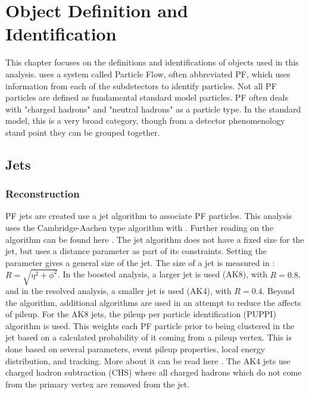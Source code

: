 \chapter{Object Definition and Identification}
\label{ch:objs}
This chapter focuses on the definitions and identifications of objects used in this analysis.  \CMS uses a system called Particle Flow, often abbreviated PF, which uses information from each of the subdetectors to identify particles. Not all PF particles are defined as fundamental standard model particles. PF often deals with "charged hadrons" and "neutral hadrons" as a particle type. In the standard model, this is a very broad category, though from a detector phenomenology stand point they can be grouped together.
\section{Jets}

\subsection{Reconstruction}
\label{sec:jetreco}
PF jets are created use a jet algorithm to associate PF particles. This analysis uses the Cambridge-Aachen type algorithm with \antikt. Further reading on the \antikt algorithm can be found here . The jet algorithm does not have a fixed size for the jet, but uses a distance parameter as part of its constraints. Setting the parameter gives a general size of the jet.  The size of a jet is measured in \etaphi: \ensuremath{R=\sqrt{\eta^2+\phi^2}}.  In the boosted analysis, a larger jet is used (AK8), with \ensuremath{R=0.8}, and in the resolved analysis, a smaller jet is used (AK4), with \ensuremath{R=0.4}.  Beyond the \antikt algorithm, additional algorithms are used in an attempt to reduce the affects of pileup.  For the AK8 jets, the pileup per particle identification (PUPPI) algorithm is used.  This weights each PF particle prior to being clustered in the jet based on a calculated probability of it coming from a pileup vertex.  This is done based on several parameters, event pileup properties, local energy distribution, and tracking.  More about it can be read here \cite{PUPPI}.  The AK4 jets use charged hadron subtraction (CHS) where all charged hadrons which do not come from the primary vertex are removed from the jet.
